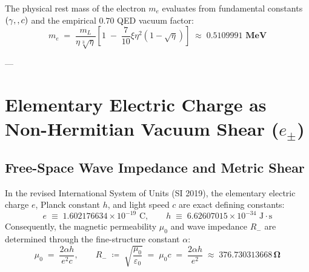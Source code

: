 \documentclass[
    12pt,
    a4paper,
    headings=normal,
    twoside=false,
    open=any,
    parskip=half
]{scrbook}
\let\hbar\relax
\begin{document}
\begin{phystheorem}\label{thm:ch5_exact_electron_mass_theorem}
The physical rest mass of the electron $m_e$ evaluates from fundamental constants $(\gamma, \hbar, c)$ and the empirical $0.70$ QED vacuum factor:
\begin{equation}
\boxed{m_e \;=\; \frac{m_L}{\eta \sqrt[3]{\eta}} \left[ 1 \;-\; \frac{7}{10}\xi \eta^2 \left( 1 - \sqrt{\eta} \right) \right] \;\approx\; \mathbf{0.5109991 \text{ MeV}}}
\label{eq:ch5_electron_mass_exact_master}
\end{equation}
\end{phystheorem}

---

\section{Elementary Electric Charge as Non-Hermitian Vacuum Shear ($e_\pm$)}
\label{sec:ch5_elementary_charge}

\subsection{Free-Space Wave Impedance and Metric Shear}

In the revised International System of Units (SI 2019), the elementary electric charge $e$, Planck constant $h$, and light speed $c$ are exact defining constants:
\begin{equation}
e \;\equiv\; 1.602176634 \times 10^{-19} \text{ C}, \qquad h \;\equiv\; 6.62607015 \times 10^{-34} \text{ J}\cdot\text{s}
\end{equation}
Consequently, the magnetic permeability $\mu_0$ and wave impedance $R_-$ are determined through the fine-structure constant $\alpha$:
\begin{equation}
\mu_0 \;=\; \frac{2\alpha h}{e^2 c}, \qquad R_- \;\coloneqq\; \sqrt{\frac{\mu_0}{\varepsilon_0}} \;=\; \mu_0 c \;=\; \frac{2\alpha h}{e^2} \;\approx\; \mathbf{376.730313668 \, \Omega}
\label{eq:ch5_vacuum_impedance}
\end{equation}
\end{document}
